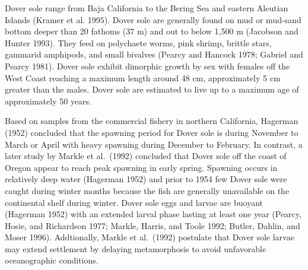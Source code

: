 \documentclass[11pt,
  english,
  a4paper,
]{article}
\begin{document}

Dover sole range from Baja California to the Bering Sea and eastern Aleutian Islands {(Kramer et al. 1995)\leavevmode\tagmcend\tagstructend}. Dover sole are generally found on mud or mud-sand bottom deeper than 20 fathoms (37 m) and out to below 1,500 m {(Jacobson and Hunter 1993)\leavevmode\tagmcend\tagstructend}. They feed on polychaete worms, pink shrimp, brittle stars, gammarid amphipods, and small bivalves {(Pearcy and Hancock 1978; Gabriel and Pearcy 1981)\leavevmode\tagmcend\tagstructend}. Dover sole exhibit dimorphic growth by sex with females off the West Coast reaching a maximum length around 48 cm, approximately 5 cm greater than the males. Dover sole are estimated to live up to a maximum age of approximately 50 years.

\leavevmode\tagmcend\tagstructend\par


Based on samples from the commercial fishery in northern California, Hagerman {(1952)\leavevmode\tagmcend\tagstructend} concluded that the spawning period for Dover sole is during November to March or April with heavy spawning during December to February. In contrast, a later study by Markle et al.~{(1992)\leavevmode\tagmcend\tagstructend} concluded that Dover sole off the coast of Oregon appear to reach peak spawning in early spring. Spawning occurs in relatively deep water {(Hagerman 1952)\leavevmode\tagmcend\tagstructend} and prior to 1954 few Dover sole were caught during winter months because the fish are generally unavailable on the continental shelf during winter. Dover sole eggs and larvae are buoyant {(Hagerman 1952)\leavevmode\tagmcend\tagstructend} with an extended larval phase lasting at least one year {(Pearcy, Hosie, and Richardson 1977; Markle, Harris, and Toole 1992; Butler, Dahlin, and Moser 1996)\leavevmode\tagmcend\tagstructend}. Addtionally, Markle et al.~{(1992)\leavevmode\tagmcend\tagstructend} postulate that Dover sole larvae may extend settlement by delaying metamorphosis to avoid unfavorable oceanographic conditions.
\end{document}
